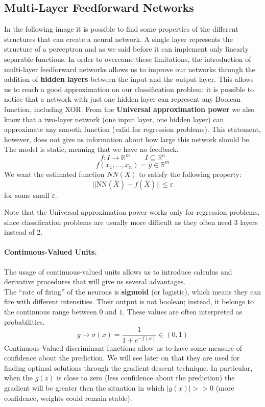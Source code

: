 \subsection{Multi-Layer Feedforward Networks}
In the following image it is possible to find some properties of the different structures that can create a neural network.
A single layer represents the structure of a perceptron and as we said before it can implement only linearly separable functions. In order to overcome these limitations, the introduction of multi-layer feedforward networks allows us to improve our networks through the addition of \textbf{hidden layers} between the input and the output layer. This allows us to reach a good approximation on our classification problem: it is possible to notice that a network with just one hidden layer can represent any Boolean function, including XOR. From the \textbf{Universal approximation power} we also know that a two-layer network (one input layer, one hidden layer) can approximate any smooth function (valid for regression problems). This statement, however, does not give us information about how large this network should be. The model is static, meaning that we have no feedback.
$$f: I \rightarrow \mathbb{ R }^m \qquad I \subseteq \mathbb{ R }^n$$
$$f(x_1,\dots,x_n) = \bar{y}\in \mathbb{ R }^m$$
We want the estimated function $NN(X)$ to satisfy the following property:
$$||\text{NN}(\bar X)- f(\bar X)|| \leq \varepsilon$$
for some small $\varepsilon$.

		

Note that the Universal approximation power works only for regression problems, since classification problems are usually more difficult as they often need 3 layers instead of 2.

\paragraph*{Continuous-Valued Units.} The usage of continuous-valued units allows us to introduce calculus and derivative procedures that will give us several advantages.\\ 
The ``rate of firing'' of the neurons is \textbf{sigmoid} (or logistic), which means they can fire with different intensities. Their output is not boolean; instead, it belongs to the continuous range between $0$ and $1$. These values are often interpreted as probabilities.
$$g \rightarrow \sigma(x) = \frac{1}{1+e^{-f(x)}} \in (0,1)$$
Continuous-Valued discriminant functions allow us to have some measure of confidence about the prediction. We will see later on that they are used for finding optimal solutions through the gradient descent technique. In particular, when the $g(z)$ is close to zero (less confidence about the prediction) the gradient will be greater then the situation in which $|g(x)| >> 0$ (more confidence, weights could remain stable).\\

